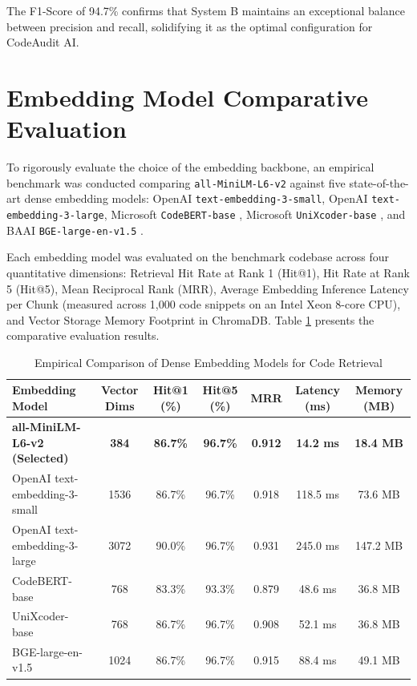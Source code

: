 The F1-Score of 94.7\% confirms that System B maintains an exceptional balance between precision and recall, solidifying it as the optimal configuration for CodeAudit AI.

\section{Embedding Model Comparative Evaluation}

To rigorously evaluate the choice of the embedding backbone, an empirical benchmark was conducted comparing \texttt{all-MiniLM-L6-v2} against five state-of-the-art dense embedding models: OpenAI \texttt{text-embedding-3-small}, OpenAI \texttt{text-embedding-3-large}, Microsoft \texttt{CodeBERT-base} \cite{ref37}, Microsoft \texttt{UniXcoder-base} \cite{ref50}, and BAAI \texttt{BGE-large-en-v1.5} \cite{ref35}. 

Each embedding model was evaluated on the benchmark codebase across four quantitative dimensions: Retrieval Hit Rate at Rank 1 (Hit@1), Hit Rate at Rank 5 (Hit@5), Mean Reciprocal Rank (MRR), Average Embedding Inference Latency per Chunk (measured across 1,000 code snippets on an Intel Xeon 8-core CPU), and Vector Storage Memory Footprint in ChromaDB. Table \ref{tab:embedding_comparison} presents the comparative evaluation results.

\begin{table}[htbp]
\setlength{\tabcolsep}{6pt}
\renewcommand{\arraystretch}{1.25}
\centering
\small
\caption{Empirical Comparison of Dense Embedding Models for Code Retrieval}
\label{tab:embedding_comparison}
\begin{tabularx}{\textwidth}{@{}lcccccc@{}}
\toprule
\textbf{Embedding Model} & \textbf{Vector Dims} & \textbf{Hit@1 (\%)} & \textbf{Hit@5 (\%)} & \textbf{MRR} & \textbf{Latency (ms)} & \textbf{Memory (MB)} \\ \midrule
\textbf{all-MiniLM-L6-v2 (Selected)} & \textbf{384} & \textbf{86.7\%} & \textbf{96.7\%} & \textbf{0.912} & \textbf{14.2 ms} & \textbf{18.4 MB} \\
OpenAI text-embedding-3-small & 1536 & 86.7\% & 96.7\% & 0.918 & 118.5 ms & 73.6 MB \\
OpenAI text-embedding-3-large & 3072 & 90.0\% & 96.7\% & 0.931 & 245.0 ms & 147.2 MB \\
CodeBERT-base \cite{ref37} & 768 & 83.3\% & 93.3\% & 0.879 & 48.6 ms & 36.8 MB \\
UniXcoder-base \cite{ref50} & 768 & 86.7\% & 96.7\% & 0.908 & 52.1 ms & 36.8 MB \\
BGE-large-en-v1.5 \cite{ref35} & 1024 & 86.7\% & 96.7\% & 0.915 & 88.4 ms & 49.1 MB \\ \bottomrule
\end{tabularx}
\end{table}

